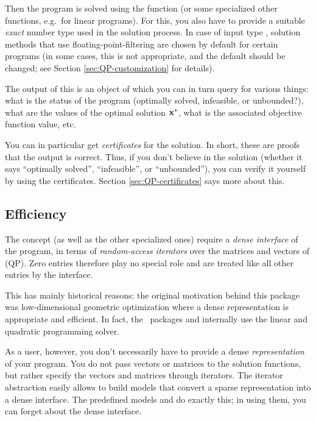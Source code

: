 Then the program is solved using the function
 (or some specialized other functions,
e.g.\ for linear programs). For this, you also have to provide a
suitable \emph{exact} number type  used in the solution
process. In case of input type , solution methods that use
floating-point-filtering are chosen by default for certain programs
(in some cases, this is not appropriate, and the default should be
changed; see Section \ref{sec:QP-customization} for details).

The output of this is an object of 
which you can in turn query for various things: what is the status of 
the program (optimally solved, infeasible, or unbounded?), what are 
the values of the optimal solution $\mathbf{x}^*$, what is the associated
objective function value, etc. 

You can in particular get \emph{certificates} for the solution. In short,
these are proofs that the output is correct. Thus, if you don't believe 
in the solution (whether it says ``optimally solved'', ``infeasible'', 
or ``unbounded''), you can verify it yourself by using the certificates.
Section \ref{sec:QP-certificates} says more about this.

\subsection{Efficiency}
The concept  (as well as the
other specialized ones) require a \emph{dense interface} 
of the program, in terms of \emph{random-access iterators} over 
the matrices and vectors of (QP). Zero entries therefore play no
special role and are treated like all other entries by the
interface.  

This has mainly historical
reasons: the original motivation behind this package was 
low-dimensional geometric optimization where 
a dense representation is appropriate and efficient. In fact, 
the \cgal\ packages  and
 internally use the linear 
and quadratic programming solver. 

As a user, however, you don't necessarily have to provide a dense
\emph{representation} of your program. You do not pass vectors or
matrices to the solution functions, but rather specify the vectors 
and matrices through iterators. The iterator abstraction 
easily allows to build models that convert a sparse representation 
into a dense interface. The predefined models  
and  do exactly this; in using them, 
you can forget about the dense interface.  

